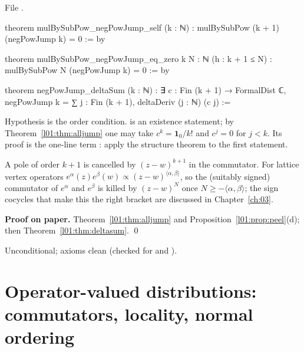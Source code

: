 \noindent File .
\begin{leancode}
theorem mulBySubPow_negPowJump_self (k : ℕ) :
    mulBySubPow (k + 1) (negPowJump k) = 0 := by

theorem mulBySubPow_negPowJump_eq_zero {k N : ℕ} (h : k + 1 ≤ N) :
    mulBySubPow N (negPowJump k) = 0 := by

theorem negPowJump_deltaSum (k : ℕ) :
    ∃ c : Fin (k + 1) → FormalDist ℂ,
      negPowJump k = ∑ j : Fin (k + 1), deltaDeriv (j : ℕ) (c j) :=
\end{leancode}

\begin{dictionary}
Hypothesis  is the order condition.  is an existence statement; by
Theorem~\ref{l01:thm:alljump} one may take $c^k = \mathbf 1_0/k!$ and $c^j = 0$ for $j<k$. Its proof is the one-line
term : apply the structure
theorem to the first statement.
\end{dictionary}

\begin{physics}
A pole of order $k+1$ is cancelled by $(z-w)^{k+1}$ in the commutator. For lattice vertex operators
$e^\alpha(z)e^\beta(w)\propto(z-w)^{\langle\alpha,\beta\rangle}$, so the (suitably signed) commutator of $e^\alpha$ and $e^\beta$ is killed by $(z-w)^N$
once $N\ge-\langle\alpha,\beta\rangle$; the sign cocycles that make this the right bracket are discussed in
Chapter~\ref{ch:03}.
\end{physics}

\textbf{Proof on paper.} Theorem~\ref{l01:thm:alljump} and Proposition~\ref{l01:prop:peel}(d); then
Theorem~\ref{l01:thm:deltasum}. \qed

\begin{status}
Unconditional; axioms clean (checked for  and
).
\end{status}

\section{Operator-valued distributions: commutators, locality, normal ordering}\label{l01:sec:operators}

